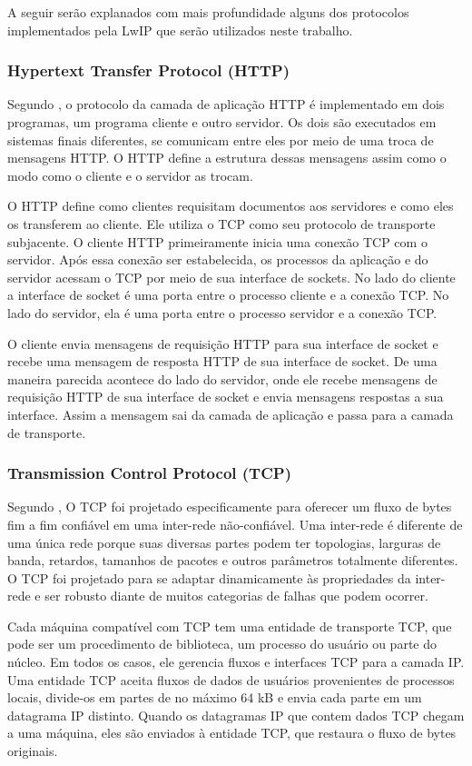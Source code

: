 A seguir serão explanados com mais profundidade alguns dos protocolos implementados pela LwIP que serão utilizados neste trabalho.

\subsubsection{Hypertext Transfer Protocol (HTTP)}
Segundo , o protocolo da camada de aplicação HTTP é implementado em dois programas, um programa cliente e outro servidor. Os dois são executados em sistemas finais diferentes, se comunicam entre eles por meio de uma troca de mensagens HTTP. O HTTP define a estrutura dessas mensagens assim como o modo como o cliente e o servidor as trocam. 

O HTTP define como clientes requisitam documentos aos servidores e como eles os transferem ao cliente. Ele utiliza o TCP como seu protocolo de transporte subjacente. O cliente HTTP primeiramente inicia uma conexão TCP com o servidor. Após essa conexão ser estabelecida, os processos da aplicação e do servidor acessam o TCP por meio de sua interface de sockets. No lado do cliente a interface de socket é uma porta entre o processo cliente e a conexão TCP. No lado do servidor, ela é uma porta entre o processo servidor  e a conexão TCP.

O cliente envia mensagens de requisição HTTP para sua interface de socket e recebe uma mensagem de resposta HTTP de sua interface de socket. De uma maneira parecida acontece do lado do servidor, onde ele recebe mensagens de requisição HTTP de sua interface de socket e envia mensagens respostas a sua interface. Assim a mensagem sai da camada de aplicação e passa para a camada de transporte. 

\subsubsection{Transmission Control Protocol (TCP)}

Segundo , O TCP foi projetado especificamente para oferecer um fluxo de bytes fim a fim confiável em uma inter-rede não-confiável. Uma inter-rede é diferente de uma única rede porque suas diversas partes podem ter topologias, larguras de banda, retardos, tamanhos de pacotes e outros parâmetros totalmente diferentes. O TCP foi projetado para se adaptar dinamicamente às propriedades da inter-rede e ser robusto diante de muitos categorias de falhas que podem ocorrer.

Cada máquina compatível com TCP tem uma entidade de transporte TCP, que pode ser um procedimento de biblioteca, um processo do usuário ou parte do núcleo. Em todos os casos, ele gerencia fluxos e interfaces TCP para a camada IP. Uma entidade TCP aceita fluxos de dados de usuários provenientes de processos locais, divide-os em partes de no máximo 64 kB e envia cada parte em um datagrama IP distinto. Quando os datagramas IP que contem dados TCP chegam a uma máquina, eles são enviados à entidade TCP, que restaura o fluxo de bytes originais.

